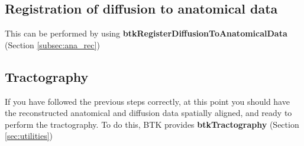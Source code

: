 \subsection{Registration of diffusion to anatomical data}
This can be performed by using \textbf{btkRegisterDiffusionToAnatomicalData}
(Section \ref{subsec:ana_rec})

\subsection{Tractography}
If you have followed the previous steps correctly, at this point you should
have the reconstructed anatomical and diffusion data spatially aligned, and
ready to perform the tractography. To do this, BTK provides
\textbf{btkTractography} (Section \ref{sec:utilities})

